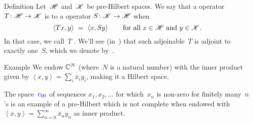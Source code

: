 \documentclass[a]{subfiles}
\begin{document}
\begin{parsec}[hilb]
\begin{point}{Definition}
Let~$\mathscr{H}$ and~$\mathscr{K}$ be pre-Hilbert spaces.
We say that a operator~$T\colon \mathscr{H}\to \mathscr{K}$
is %
to a operator
$S\colon \mathscr{K}\to \mathscr{H}$ 
when
\begin{equation*}
\left<Tx,y\right> \ = \ \left<x,Sy\right>
\qquad\text{for all $x\in \scrH$ and $y\in \scrK$.}
\end{equation*}
In that case, we call~$T$ .%
%
We'll see (in~)
that such adjoinable~$T$ is adjoint to exactly one~$S$,
which we denote by~.%
\end{point}
\begin{point}{Example}%
We endow $\mathbb{C}^N$%
(where~$N$ is a natural number)
with the inner product
given by
$\left<x,y\right>=\sum_i \overline{x}_iy_i$,
making it a Hilbert space.

The space~$\Define{c_{00}}$%
of sequences $x_1,x_2,\dotsc$
for which~$x_n$ is non-zero
for finitely many~$n$'s
is an example of a 
pre-Hilbert
which is not complete
when  endowed with $\left<x,y\right>=\sum_{n=0}^\infty \overline{x}_ny_n$
as inner product.


\end{point}
\end{parsec}
\end{document}
